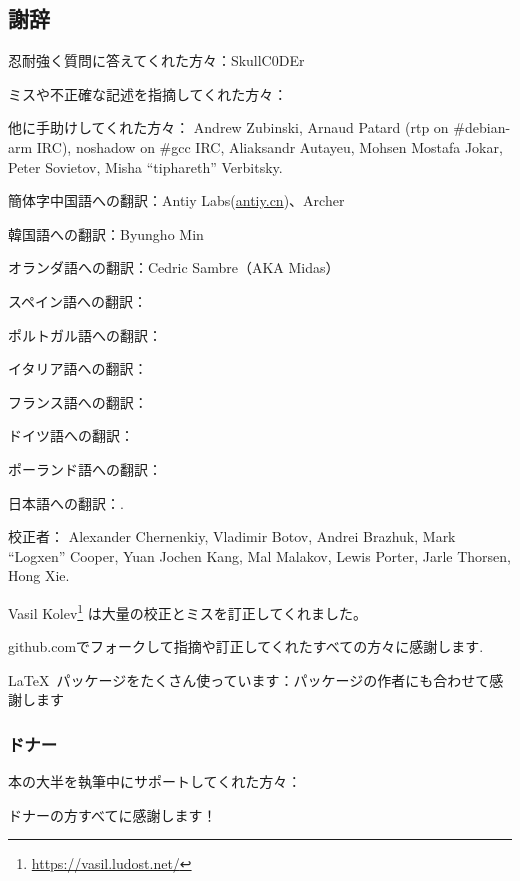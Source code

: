 \subsection*{謝辞}

忍耐強く質問に答えてくれた方々：SkullC0DEr

ミスや不正確な記述を指摘してくれた方々：\PeopleMistakesInaccuracies{}

他に手助けしてくれた方々：
Andrew Zubinski,
Arnaud Patard (rtp on \#debian-arm IRC),
noshadow on \#gcc IRC,
Aliaksandr Autayeu,
Mohsen Mostafa Jokar,
Peter Sovietov,
Misha ``tiphareth'' Verbitsky.

簡体字中国語への翻訳：Antiy Labs(\href{http://antiy.cn}{antiy.cn})、Archer

韓国語への翻訳：Byungho Min

オランダ語への翻訳：Cedric Sambre（AKA Midas）

スペイン語への翻訳： \PeopleSpanishTranslators{}

ポルトガル語への翻訳：\PeoplePTBRTranslators{}

イタリア語への翻訳：\PeopleItalianTranslators{}

フランス語への翻訳：\PeopleFrenchTranslators{}

ドイツ語への翻訳：\PeopleGermanTranslators{}

ポーランド語への翻訳：\PeoplePolishTranslators{}

日本語への翻訳：\PeopleJapaneseTranslators{}.

校正者：
Alexander  Chernenkiy,
Vladimir Botov,
Andrei Brazhuk,
Mark ``Logxen'' Cooper, Yuan Jochen Kang, Mal Malakov, Lewis Porter, Jarle Thorsen, Hong Xie.

Vasil Kolev\footnote{\url{https://vasil.ludost.net/}} は大量の校正とミスを訂正してくれました。

github.comでフォークして指摘や訂正してくれたすべての方々に感謝します.

\LaTeX\ パッケージをたくさん使っています：パッケージの作者にも合わせて感謝します

\subsubsection*{ドナー}

本の大半を執筆中にサポートしてくれた方々：



ドナーの方すべてに感謝します！

